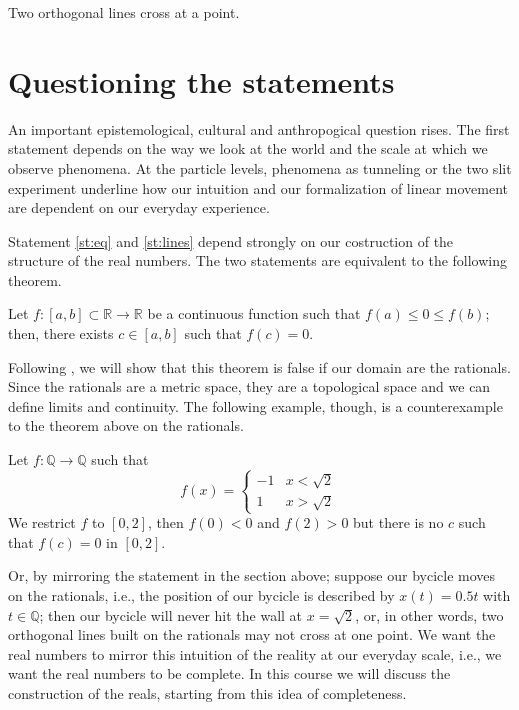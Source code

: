 \begin{statement}\label{st:lines}
Two orthogonal lines cross at a point.
\end{statement}

\section{Questioning the statements}
An important epistemological, cultural and anthropogical question rises. 
The first statement depends on the way we look at the world and the scale at which we observe phenomena.
At the particle levels, phenomena as tunneling or the two slit experiment underline how our intuition 
and our formalization of linear movement are dependent on our everyday experience.

Statement \ref{st:eq} and \ref{st:lines} depend strongly on our costruction of the structure of the real numbers.
The two statements are equivalent to the following theorem.

\begin{theorem}
Let $f:[a, b] \subset \mathbb{R}\to \mathbb{R}$ be a continuous function such that 
$f(a)\leq 0 \leq f(b)$; then, there exists $c\in [a,b]$ such that $f(c)=0$.
\end{theorem}

Following \cite{Koerner2004}, we will show that this theorem is false if our domain are the rationals.
Since the rationals are a metric space, they are a topological space and we can define limits and 
continuity.
The following example, though, is a counterexample to the theorem above on the rationals.

\begin{example}
Let $f:\mathbb{Q}\to \mathbb{Q}$ such that 
\[
f(x)=\begin{cases}
    -1 & x< \sqrt{2}\\
    1 & x> \sqrt{2}
\end{cases}
\]
We restrict $f$ to $[0,2]$, then $f(0)<0$ and $f(2)>0$ but there is no $c$ such that $f(c)=0$ in $[0,2]$.
\end{example}

Or, by mirroring the statement in the section above; suppose our bycicle 
moves on the rationals, i.e., the position of our bycicle is described by 
$x(t) = 0.5t$ with $t\in \mathbb{Q}$; then our bycicle will never hit the wall at $x=\sqrt{2}$,
or, in other words, two orthogonal lines built on the rationals may not cross at one point.
We want the real numbers to mirror this intuition of the reality at our everyday scale, i.e.,
we want the real numbers to be complete.
In this course we will discuss the construction of the reals, starting from this idea of completeness.

